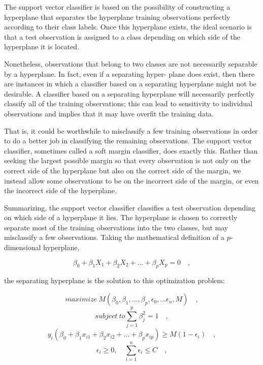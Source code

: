 \documentclass[a4paper, 12pt]{book}
\begin{document}
The support vector classifier is based on the possibility of constructing a
hyperplane that separates the hyperplane training observations perfectly
according to their class labels. Once this hyperplane exists, the ideal scenario
is that a test observation is assigned to a class depending on which side of
the hyperplane it is located.

Nonetheless, observations that belong to two classes are not
necessarily separable by a hyperplane. In fact, even if a separating hyper-
plane does exist, then there are instances in which a classifier based on
a separating hyperplane might not be desirable. A classifier based on a
separating hyperplane will necessarily perfectly classify all of the training
observations; this can lead to sensitivity to individual observations and implies
that it may have overfit the training data.

That is, it could be worthwhile to misclassify a few training observations
in order to do a better job in classifying the remaining observations.
The support vector classifier, sometimes called a soft margin classifier,
does exactly this. Rather than seeking the largest possible margin so that
every observation is not only on the correct side of the hyperplane but
also on the correct side of the margin, we instead allow some observations
to be on the incorrect side of the margin, or even the incorrect side of
the hyperplane.

Summarizing, the support vector classifier classifies a test observation depending on
which side of a hyperplane it lies. The hyperplane is chosen to correctly
separate most of the training observations into the two classes, but may
misclassify a few observations. Taking the mathematical definition of a $p$-dimensional hyperplane, 
\begin{center}
\begin{equation}
\beta_{0} + \beta_{1}X_{1} + \beta_{2}X_{2} + ... + \beta_{p}X_{p} = 0 \quad,
\end{equation}
\end{center}
the separating hyperplane is the solution to this optimization problem:
\begin{center}
\begin{equation}
maximize\ M (\beta_{0}, \beta_{1},...,\beta_{p}, \epsilon_{0}
,...\epsilon_{n}, M)\quad,
\end{equation}
\begin{equation}
subject\ to \sum_{j=1}^{p} \beta_{j}^2 = 1 \quad,
\end{equation}
\begin{equation}
y_{i}(\beta_{0} + \beta_{1}x_{i1} + \beta_{2}x_{i2} +...+ \beta_{p}x_{ip}) \geq M(1-\epsilon_{i}) \quad, 
\end{equation}
\begin{equation}
\epsilon_{i} \geq 0, \quad \sum_{i=1}^{n}\epsilon_{i} \leq C \quad, 
\end{equation}
\end{center}
\end{document}
